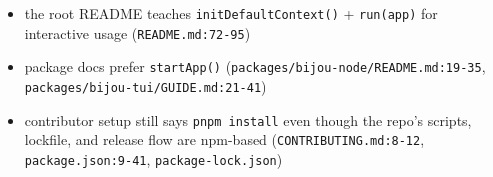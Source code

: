 \begin{itemize}
\tightlist
\item
  the root README teaches \texttt{i\allowbreak{}n\allowbreak{}i\allowbreak{}t\allowbreak{}D\allowbreak{}e\allowbreak{}f\allowbreak{}a\allowbreak{}u\allowbreak{}l\allowbreak{}t\allowbreak{}C\allowbreak{}o\allowbreak{}n\allowbreak{}t\allowbreak{}e\allowbreak{}x\allowbreak{}t\allowbreak{}(\allowbreak{})} + \texttt{r\allowbreak{}u\allowbreak{}n\allowbreak{}(\allowbreak{}a\allowbreak{}p\allowbreak{}p\allowbreak{})} for interactive usage (\texttt{R\allowbreak{}E\allowbreak{}A\allowbreak{}D\allowbreak{}M\allowbreak{}E\allowbreak{}.\allowbreak{}m\allowbreak{}d\allowbreak{}:\allowbreak{}7\allowbreak{}2\allowbreak{}-\allowbreak{}9\allowbreak{}5})
\item
  package docs prefer \texttt{s\allowbreak{}t\allowbreak{}a\allowbreak{}r\allowbreak{}t\allowbreak{}A\allowbreak{}p\allowbreak{}p\allowbreak{}(\allowbreak{})} (\texttt{p\allowbreak{}a\allowbreak{}c\allowbreak{}k\allowbreak{}a\allowbreak{}g\allowbreak{}e\allowbreak{}s\allowbreak{}/\allowbreak{}b\allowbreak{}i\allowbreak{}j\allowbreak{}o\allowbreak{}u\allowbreak{}-\allowbreak{}n\allowbreak{}o\allowbreak{}d\allowbreak{}e\allowbreak{}/\allowbreak{}R\allowbreak{}E\allowbreak{}A\allowbreak{}D\allowbreak{}M\allowbreak{}E\allowbreak{}.\allowbreak{}m\allowbreak{}d\allowbreak{}:\allowbreak{}1\allowbreak{}9\allowbreak{}-\allowbreak{}3\allowbreak{}5}, \texttt{p\allowbreak{}a\allowbreak{}c\allowbreak{}k\allowbreak{}a\allowbreak{}g\allowbreak{}e\allowbreak{}s\allowbreak{}/\allowbreak{}b\allowbreak{}i\allowbreak{}j\allowbreak{}o\allowbreak{}u\allowbreak{}-\allowbreak{}t\allowbreak{}u\allowbreak{}i\allowbreak{}/\allowbreak{}G\allowbreak{}U\allowbreak{}I\allowbreak{}D\allowbreak{}E\allowbreak{}.\allowbreak{}m\allowbreak{}d\allowbreak{}:\allowbreak{}2\allowbreak{}1\allowbreak{}-\allowbreak{}4\allowbreak{}1})
\item
  contributor setup still says \texttt{p\allowbreak{}n\allowbreak{}p\allowbreak{}m\allowbreak{} \allowbreak{}i\allowbreak{}n\allowbreak{}s\allowbreak{}t\allowbreak{}a\allowbreak{}l\allowbreak{}l} even though the repo's scripts, lockfile, and release flow are npm-based (\texttt{C\allowbreak{}O\allowbreak{}N\allowbreak{}T\allowbreak{}R\allowbreak{}I\allowbreak{}B\allowbreak{}U\allowbreak{}T\allowbreak{}I\allowbreak{}N\allowbreak{}G\allowbreak{}.\allowbreak{}m\allowbreak{}d\allowbreak{}:\allowbreak{}8\allowbreak{}-\allowbreak{}1\allowbreak{}2}, \texttt{p\allowbreak{}a\allowbreak{}c\allowbreak{}k\allowbreak{}a\allowbreak{}g\allowbreak{}e\allowbreak{}.\allowbreak{}j\allowbreak{}s\allowbreak{}o\allowbreak{}n\allowbreak{}:\allowbreak{}9\allowbreak{}-\allowbreak{}4\allowbreak{}1}, \texttt{p\allowbreak{}a\allowbreak{}c\allowbreak{}k\allowbreak{}a\allowbreak{}g\allowbreak{}e\allowbreak{}-\allowbreak{}l\allowbreak{}o\allowbreak{}c\allowbreak{}k\allowbreak{}.\allowbreak{}j\allowbreak{}s\allowbreak{}o\allowbreak{}n})
\end{itemize}

